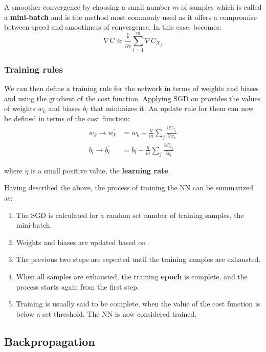 A smoother convergence by choosing a small number $m$ of samples which
is called a \textbf{mini-batch} and is the method most commonly used as
it offers a compromise between speed and smoothness of convergence.
In this case,  becomes:
\begin{equation}
  \label{eq:cost_func_stoch}
  \nabla C \approx \frac{1}{m} \sum_{i=1}^m \nabla C_{X_j}
\end{equation}

\subsubsection*{Training rules}

We can then define a training rule for the network in terms of
weights and biases and using the gradient of the cost function.
Applying SGD on  provides
the values of weights $w_k$  and biases $b_l$ that minimizes it. An update rule
for them can now be defined in terms of the cost function:
\begin{align}
  w_k \rightarrow w^{'}_k &= w_k - \frac{\eta}{m}\sum_j \frac{\partial C_{x_j}}{\partial w_k} \nonumber \\
  b_l \rightarrow b^{'}_l &= b_l - \frac{\eta}{m}\sum_j \frac{\partial C_{x_j}}{\partial b_l}
  \label{eq:update_w_b}
\end{align}

where $\eta$ is a small positive value, the \textbf{learning rate}. 

Having described the above, the process of training the NN can be summarized as:
\begin{enumerate}
\item The SGD is calculated for a random set number of training samples, the mini-batch.
\item Weights and biases are updated based on .
\item The previous two steps are repeated until the training samples are exhausted.
\item When all samples are exhausted, the training \textbf{epoch} is complete, and the
  process starts again from the first step.
\item Training is usually said to be complete, when the value of  the cost function
  is below a set threshold. The NN is now considered trained.
\end{enumerate}

\subsection{Backpropagation}

